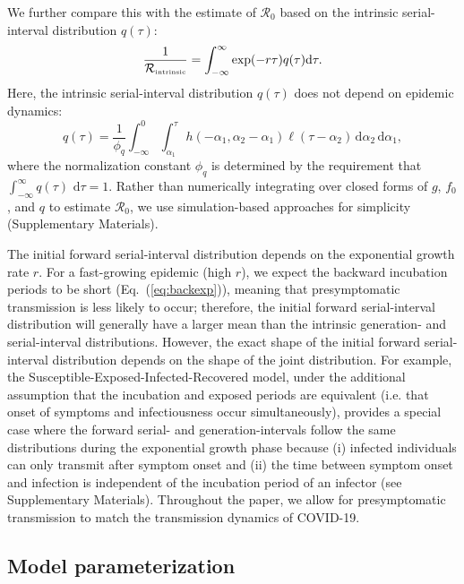 \documentclass[12pt]{article}
\newcommand{\eref}[1]{Eq.~(\ref{eq:#1})}
\newcommand{\Rx}[1]{\ensuremath{{\mathcal R}_{#1}}\xspace}
\newcommand{\Ro}{\Rx{0}}
\newcommand{\Rintrinsic}{\ensuremath{{\mathcal R}_{\textrm{\tiny intrinsic}}}\xspace}
\newcommand{\dd}[1]{\ensuremath{\, \mathrm{d}#1}}
\newcommand{\dtau}{\dd{\tau}}
\newcommand{\pinf}{\ensuremath{\alpha_1}} %
\newcommand{\sinf}{\ensuremath{\alpha_2}} %
\newcommand{\idist}{\ell} %
\begin{document}
We further compare this with the estimate of \Ro based on the intrinsic serial-interval distribution $q(\tau)$:
\begin{equation}
\frac{1}{\Rintrinsic} = \int_{-\infty}^\infty \exp(-r\tau) q(\tau) \mathrm{d} \tau.
\label{eq:Rintrinsic}
\end{equation}
Here, the intrinsic serial-interval distribution $q(\tau)$ does not depend on epidemic dynamics:
\begin{equation}
q(\tau) = \frac{1}{\phi_q} \int_{-\infty}^{0} \int_{\pinf}^{\tau} h(-\pinf, \sinf - \pinf) \idist(\tau - \sinf) \, \mathrm{d}\sinf\,\mathrm{d}\pinf,
\label{eq:intrinsicSI}
\end{equation}
where the normalization constant $\phi_q$ is determined by the
requirement that $\int_{-\infty}^\infty q(\tau)\,\dtau=1$.
Rather than numerically integrating over closed forms of $g$, $f_0$, and $q$ to estimate $\Ro$, we use simulation-based approaches for simplicity (Supplementary Materials).

The initial forward serial-interval distribution depends on the exponential growth rate $r$.
For a fast-growing epidemic (high $r$), we expect the backward incubation periods to be short (\eref{backexp}), meaning that presymptomatic transmission is less likely to occur; 
therefore, the initial forward serial-interval distribution will generally have a larger mean than the intrinsic generation- and serial-interval distributions.
However, the exact shape of the initial forward serial-interval distribution depends on the shape of the joint distribution.
For example, the Susceptible-Exposed-Infected-Recovered model, under the additional assumption that the incubation and exposed periods are equivalent (i.e. that onset of symptoms and infectiousness occur simultaneously), provides a special case where the forward serial- and generation-intervals follow the same distributions during the exponential growth phase because (i) infected individuals can only transmit after symptom onset and (ii) the time between symptom onset and infection is independent of the incubation period of an infector (see Supplementary Materials).
Throughout the paper, we allow for presymptomatic transmission to match the transmission dynamics of COVID-19.

\subsection{Model parameterization}
\end{document}
